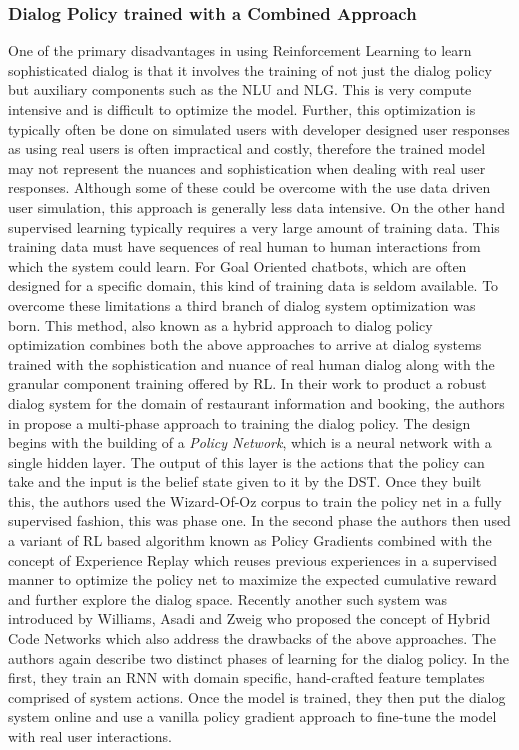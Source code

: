 \documentclass[14pt]{extarticle}
\numberwithin{equation}{section}
\begin{document}
	\subsubsection{Dialog Policy trained with a Combined Approach}
	One of the primary disadvantages in using Reinforcement Learning to learn sophisticated dialog is that it involves the training of not just the dialog policy but auxiliary components such as the NLU and NLG. This is very compute intensive and is difficult to optimize the model. Further, this optimization is typically often be done on simulated users with developer designed user responses as using real users is often impractical and costly, therefore the trained model may not represent the nuances and sophistication when dealing with real user responses.
	Although some of these could be overcome with the use data driven user simulation, this approach is generally less data intensive.
	 On the other hand supervised learning typically requires a very large amount of training data. This training data must have sequences of real human to human interactions from which the system could learn. For Goal Oriented chatbots, which are often designed for a specific domain, this kind of training data is seldom available. To overcome these limitations a third branch of dialog system optimization was born. This method, also known as a hybrid approach to dialog policy optimization combines both the above approaches to arrive at dialog systems trained with the sophistication and nuance of real human dialog along with the granular component training offered by RL. In their work to product a robust dialog system for the domain of restaurant information and booking, the authors in \cite{Su_continous_dm} propose a multi-phase approach to training the dialog policy. The design begins with the building of a \textit{Policy Network}, which is a neural network with a single hidden layer. The output of this layer is the actions that the policy can take and the input is the belief state given to it by the DST. Once they built this, the authors used the Wizard-Of-Oz corpus to train the policy net in a fully supervised fashion, this was phase one. In the second phase the authors then used a variant\cite{Schulman_trpo} of RL based algorithm known as Policy Gradients \cite{Sutton_pg} combined with the concept of Experience Replay\cite{Lin1992} which reuses previous experiences in a supervised manner to optimize the policy net to maximize the expected cumulative reward and further explore the dialog space. Recently another such system was introduced by Williams, Asadi and Zweig who proposed the concept of Hybrid Code Networks\cite{Williams_HCN_e2e} which  also address the drawbacks of the above approaches. The authors again describe two distinct phases of learning for the dialog policy. In the first, they train an RNN with domain specific, hand-crafted feature templates comprised of system actions. Once the model is trained, they then put the dialog system online and use a vanilla policy gradient\cite{Sutton_pg} approach to fine-tune the model with real user interactions. 
	\pagebreak
\end{document}
